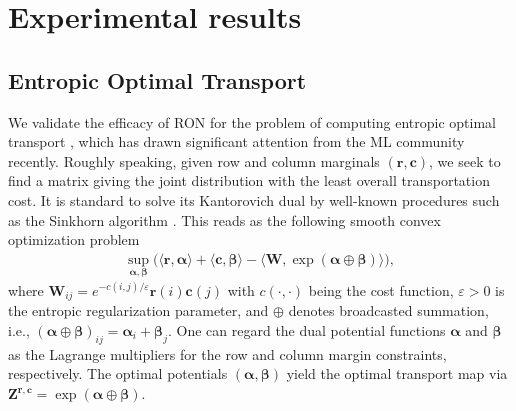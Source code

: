 \documentclass[11pt]{amsart}
\theoremstyle{plain}
\theoremstyle{definition}
\theoremstyle{remark}
\def\bZ{\mathbf{Z}}
\def\R{\mathbb{R}}
\def\eps{\varepsilon}
\def\X{\mathbf{X}}
\def\W{\mathbf{W}}
\def\balpha{\boldsymbol{\alpha}}
\def\bbeta{\boldsymbol{\beta}}
\def\r{\mathbf{r}}
\def\c{\mathbf{c}}
\DeclareMathOperator*{\argmin}{arg\,min}
\begin{document}
\section{Experimental results}
\label{sec:experiments}

\subsection{Entropic Optimal Transport}

We validate the efficacy of RON for the problem of computing entropic optimal transport \cite{cuturi2013sinkhorn, pavon2021data}, which has drawn significant attention from the ML community recently. Roughly speaking, given row and column marginals $(\r,\c)$, we seek to find a matrix giving the joint distribution with the least overall transportation cost. It is standard to solve its Kantorovich dual by well-known procedures such as the Sinkhorn algorithm \cite{cuturi2013sinkhorn}. 
This reads as the following smooth convex optimization problem 
\begin{align}\label{eq:typical_Lagrangian}
	\sup_{\balpha,\bbeta} \bigg( 
	\langle \r,\balpha \rangle  + \langle \c, \bbeta \rangle 
	- \langle \W , \exp(\balpha\oplus \bbeta) \rangle
	\bigg),
\end{align}
where $\W_{ij}=e^{-c(i,j)/\eps} \r(i)\c(j)$ with $c(\cdot,\cdot)$ being the cost function, $\eps>0$ is the entropic regularization parameter, and 
\(\oplus\) denotes broadcasted summation, i.e., \((\balpha \oplus \bbeta)_{ij} = \balpha_i + \bbeta_j\). One can regard the dual potential functions $\balpha$ and $\bbeta$ as the Lagrange multipliers for the row and column margin constraints, respectively. The optimal potentials $(\balpha,\bbeta)$ yield the optimal transport map via $\bZ^{\r,\c}=\exp(\balpha\oplus \bbeta)$. %
\end{document}
